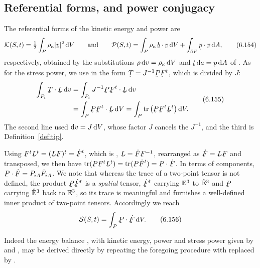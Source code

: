 \subsection*{Referential forms, and power conjugacy}

The referential forms of the kinetic energy and power are
\begin{equation}
   \mathcal{K}(S,t)=\tfrac12\int_{P}\rho_{\kappa}|\bv|^{2}\,\dl V
   \qquad\text{and}\qquad
   \mathcal{P}(S,t)=\int_{P}\rho_{\kappa}\,\ip\bb\bv\,\dl V
   +\int_{\partial P}\ip\bp\bv\,\dl A ,
   \tag{6.154}\label{eq:6.154}
\end{equation}
respectively, obtained by the substitutions
$\rho\,\mathrm{d} v=\rho_{\kappa}\,\mathrm{d} V$ and $\bt\,\dl a=\bp\,\dl A$ of
. As for the stress power, we use  in the form
$\bT=J^{-1}\bP\bF^{t}$, which is  divided by $J$:
\begin{equation}
\begin{aligned}
   \int_{P_{t}}\bT\cdot\bL\,\dl v
   &=\int_{P_{t}}J^{-1}\bP\bF^{t}\cdot\bL\,\dl v\\
   &=\int_{P}\bP\bF^{t}\cdot\bL\,\dl V
    =\int_{P}\tr\big(\bP\bF^{t}\bL^{t}\big)\,\dl V .
\end{aligned}
   \tag{6.155}\label{eq:6.155}
\end{equation}
The second line used $\mathrm{d} v=J\,\mathrm{d} V$, whose factor $J$ cancels the
$J^{-1}$, and the third is Definition~\ref{def:tip}.


Using $\bF^{t}\bL^{t}=(\bL\bF)^{t}=\dot\bF^{t}$, which is ,
$\bL=\dot\bF\bF^{-1}$, rearranged as $\dot\bF=\bL\bF$ and transposed,
we then have $\tr(\bP\bF^{t}\bL^{t})=\tr(\bP\dot\bF^{t})
=\bP\cdot\dot\bF$. In terms of components,
$\bP\cdot\dot\bF=P_{iA}\dot F_{iA}$. We note that whereas the trace of
a two-point tensor is not defined, the product $\bP\dot\bF^{t}$ is a
\emph{spatial} tensor, $\dot\bF^{t}$ carrying $\mathbb{E}^{3}$ to $\hat{\mathbb{E}}^{3}$ and $\bP$
carrying $\hat{\mathbb{E}}^{3}$ back to $\mathbb{E}^{3}$, so its trace is meaningful and furnishes
a well-defined inner product of two-point tensors. Accordingly we reach
\begin{equation}
   \mathcal{S}(S,t)=\int_{P}\bP\cdot\dot\bF\,\dl V .
   \tag{6.156}\label{eq:6.156}
\end{equation}

Indeed the energy balance , with kinetic energy, power and
stress power given by  and , may be derived
directly by repeating the foregoing procedure with  replaced
by .

